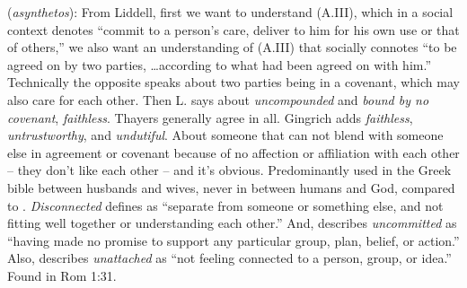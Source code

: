 \item[Uncommitted,]

(\textit{asynthetos}):
From Liddell, first we want to understand  (A.III), which in a social context denotes ``commit to a person's care, deliver to him for his own use or that of others,'' we also want an understanding of  (A.III) that socially connotes ``to be agreed on by two parties, \ldots according to what had been agreed on with him.'' Technically the opposite speaks about two parties being in a covenant, which may also care for each other. Then L. says about  \emph{uncompounded} and \emph{bound by no covenant}, \emph{faithless}. Thayers generally agree in all. Gingrich adds \emph{faithless},  \emph{untrustworthy}, and \emph{undutiful}. About someone that can not blend with someone else in agreement or covenant because of no affection or affiliation with each other -- they don’t like each other -- and it’s obvious. Predominantly used in the Greek bible between husbands and wives, never in between humans and God, compared to  . \emph{Disconnected} defines as ``separate from someone or something else, and not fitting well together or understanding each other.'' And, describes \emph{uncommitted} as ``having made no promise to support any particular group, plan, belief, or action.'' Also, describes \emph{unattached} as ``not feeling connected to a person, group, or idea.''
Found in Rom 1:31.
